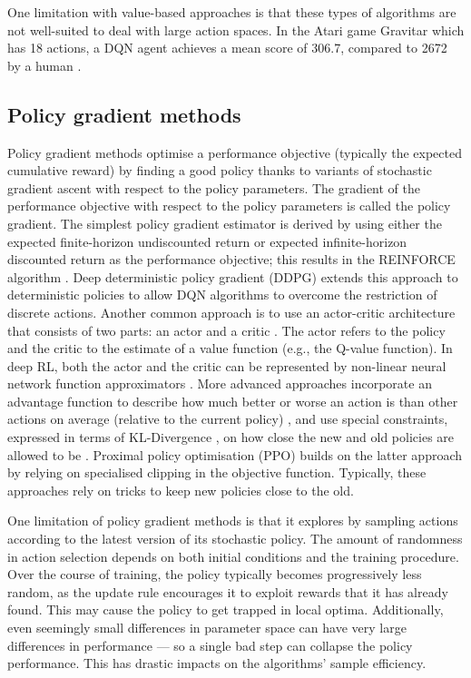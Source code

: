 \documentclass[12pt,a4paper]{article}
\begin{document}
One limitation with value-based approaches is that these types of algorithms are not well-suited to deal with large action spaces. In the Atari game Gravitar which has 18 actions, a DQN agent achieves a mean score of 306.7, compared to 2672 by a human \cite{Mnih2015}. 

\subsection{Policy gradient methods}
Policy gradient methods optimise a performance objective (typically the expected cumulative reward) by finding a good policy thanks to variants of stochastic gradient ascent with respect to the policy parameters. The gradient of the performance objective with respect to the policy parameters is called the policy gradient. The simplest policy gradient estimator is derived by using either the expected finite-horizon undiscounted return or expected infinite-horizon discounted return as the performance objective; this results in the REINFORCE algorithm \cite{Williams1992}. Deep deterministic policy gradient (DDPG) \cite{lillicrap2019continuous} extends this approach to deterministic policies to allow DQN algorithms to overcome the restriction of discrete actions. Another common approach is to use an actor-critic architecture that consists of two parts: an actor and a critic \cite{Konda2000}. The actor refers to the policy and the critic to the estimate of a value function (e.g., the Q-value function). In deep RL, both the actor and the critic can be represented by non-linear neural network function approximators \cite{mnih2016asynchronous}. More advanced approaches incorporate an advantage function to describe how much better or worse an action is than other actions on average (relative to the current policy) \cite{schulman2018highdimensional}, and use special constraints, expressed in terms of KL-Divergence \cite{kullback1951information}, on how close the new and old policies are allowed to be \cite{DBLP:journals/corr/SchulmanLMJA15}. Proximal policy optimisation (PPO) \cite{DBLP:journals/corr/SchulmanWDRK17} builds on the latter approach by relying on specialised clipping in the objective function. Typically, these approaches rely on tricks to keep new policies close to the old. 

One limitation of policy gradient methods is that it explores by sampling actions according to the latest version of its stochastic policy. The amount of randomness in action selection depends on both initial conditions and the training procedure. Over the course of training, the policy typically becomes progressively less random, as the update rule encourages it to exploit rewards that it has already found. This may cause the policy to get trapped in local optima. Additionally, even seemingly small differences in parameter space can have very large differences in performance --- so a single bad step can collapse the policy performance. This has drastic impacts on the algorithms' sample efficiency.
\end{document}
